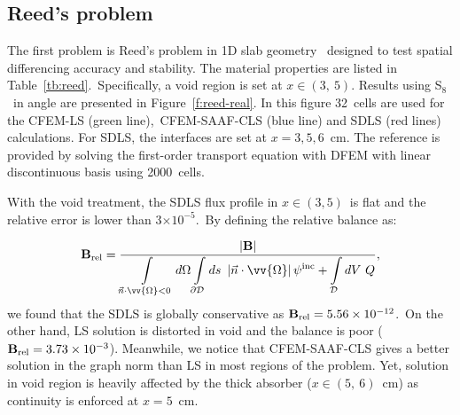 \documentclass[review]{elsarticle}
\newcommand{\st}{\sigma_\mathrm{t}}
\newcommand{\psii}[1]{\psi^\mathrm{inc}_\mathrm{{#1}}}
\newcommand{\pd}{{\partial\mathcal{D}}}
\newcommand{\intli}[1]{\int\limits_{{#1}}}
\newcommand{\ndo}{\vec{n}\cdot\ome}
\newcommand{\absndo}{\left|\ndo\right|}
\newcommand{\e}[1]{\ensuremath{\times 10^{#1}}}
\newcommand{\sigs}{\sigma_\mathrm{s}}
\newcommand{\ome}{\vv{\Omega}}
\newcommand{\dome}{d\Omega}
\begin{document}
%

\subsection{Reed's problem}
{The first problem is  Reed's problem in 1D slab geometry \cite{reed_1971}\ designed to test spatial differencing accuracy and stability. The material properties are listed in Table\ \ref{tb:reed}.\ Specifically, a void region is set at $x\in(3,~5)$. Results using S$_8$\ in angle are presented in Figure\ \ref{f:reed-real}. In this figure 32\ cells are used for the CFEM-LS (green line),\ CFEM-SAAF-CLS (blue line) and SDLS (red lines) calculations. For SDLS, the interfaces are set at $x=3,5,6$\ cm. The reference is provided by solving the first-order transport equation with {DFEM with linear discontinuous basis} using 2000\ cells. 
	
With the void treatment, the SDLS flux profile in $x\in(3,5)$\ is flat and the relative error is lower than $3\e{-5}$.\ By defining the relative balance as:}
\[{\bf B}_\mathrm{rel}=\frac{|{\bf B}|}{\displaystyle\intli{\ndo<0}\dome \intli{\pd}ds\ \absndo\psii{}+\intli{\mathcal{D}}dV\ Q},\]
{we found that the SDLS is globally conservative as ${\bf B}_\mathrm{rel}=5.56\e{-12}$.\ On the other hand, LS solution is distorted in void and the balance is poor (${\bf B}_\mathrm{rel}=3.73\e{-3}$). Meanwhile, we notice that CFEM-SAAF-CLS gives a better solution in the graph norm than LS in most regions of the problem. Yet, solution in void region is heavily affected by the thick absorber ($x\in(5,~6)$\ cm) as continuity is enforced at $x=5$\ cm.}
\end{document}
